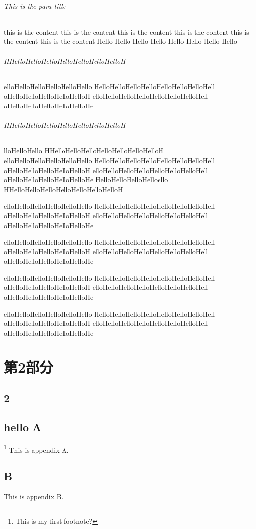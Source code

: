 \documentclass[UTF-8,hyperref]{book}
\begin{document}
\paragraph{This is the para title}
this is the content
this is the content
this is the content
this is the content
this is the content
this is the content
Hello
Hello
Hello
Hello
Hello
Hello
Hello
Hello


\paragraph{HHelloHelloHelloHelloHelloHelloHelloH}
elloHelloHelloHelloHelloHello
HelloHelloHelloHelloHelloHelloHelloHell
oHelloHelloHelloHelloHelloH
elloHelloHelloHelloHelloHelloHelloHell
oHelloHelloHelloHelloHelloHe


\paragraph{HHelloHelloHelloHelloHelloHelloHelloH}
lloHelloHello
HHelloHelloHelloHelloHelloHelloHelloH
elloHelloHelloHelloHelloHello
HelloHelloHelloHelloHelloHelloHelloHell
oHelloHelloHelloHelloHelloH
elloHelloHelloHelloHelloHelloHelloHell
oHelloHelloHelloHelloHelloHe
HelloHelloHelloHelloello
HHelloHelloHelloHelloHelloHelloHelloH


elloHelloHelloHelloHelloHello
HelloHelloHelloHelloHelloHelloHelloHell
oHelloHelloHelloHelloHelloH
elloHelloHelloHelloHelloHelloHelloHell
oHelloHelloHelloHelloHelloHe


elloHelloHelloHelloHelloHello
HelloHelloHelloHelloHelloHelloHelloHell
oHelloHelloHelloHelloHelloH
elloHelloHelloHelloHelloHelloHelloHell
oHelloHelloHelloHelloHelloHe


elloHelloHelloHelloHelloHello
HelloHelloHelloHelloHelloHelloHelloHell
oHelloHelloHelloHelloHelloH
elloHelloHelloHelloHelloHelloHelloHell
oHelloHelloHelloHelloHelloHe


elloHelloHelloHelloHelloHello
HelloHelloHelloHelloHelloHelloHelloHell
oHelloHelloHelloHelloHelloH
elloHelloHelloHelloHelloHelloHelloHell
oHelloHelloHelloHelloHelloHe
\part{第2部分}
\chapter{2}
\appendix
\chapter{hello A}
\footnote{This is my first footnote?}
This is appendix A.
\chapter{B}
This is appendix B.
\end{document}
